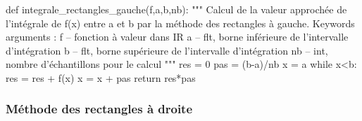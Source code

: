 \documentclass[10pt]{article}
\begin{document}
\begin{py}
\begin{python}
def integrale_rectangles_gauche(f,a,b,nb):
    """
    Calcul de la valeur approchée de l'intégrale de f(x) entre a et b par la 
    méthode des rectangles à gauche.
    Keywords arguments :
    f -- fonction à valeur dans IR
    a -- flt, borne inférieure de l'intervalle d'intégration
    b -- flt, borne supérieure de l'intervalle d'intégration
    nb -- int, nombre d'échantillons pour le calcul
    """
    res = 0
    pas = (b-a)/nb
    x = a
    while x<b:
        res = res + f(x)
        x = x + pas
    return res*pas
\end{python}
\end{py}


\subsubsection{Méthode des rectangles à droite}
\end{document}
